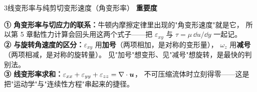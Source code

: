 \begin{kaodian}{3}{线变形率与纯剪切变形速度（角变形率）}
\textbf{重要度 }\quad{}\quad{}

\begin{banfa}
\textbf{① 角变形率与切应力的联系：}牛顿内摩擦定律里出现的"角变形速度"就是它，
所以第 5 章黏性力计算会回头用这两个式子——把 $\varepsilon_{xy}$ 与 $\tau=\mu\,\dd u/\dd y$ 一起记。\\
\textbf{② 与旋转角速度的区分：}$\varepsilon_{xy}$ 用\textbf{加号}（两项相加，是对称的变形量），
$\omega_z$ 用\textbf{减号}（两项相减，是对称的旋转量）。
见"加号"想变形、见"减号"想旋转，是最快的判别法。\\
\textbf{③ 线变形率求和：}$\varepsilon_{xx}+\varepsilon_{yy}+\varepsilon_{zz}=\nabla\cdot\bm{u}$，
不可压缩流体时立刻得零——这是把"运动学"与"连续性方程"串起来的捷径。
\end{banfa}
\end{kaodian}

